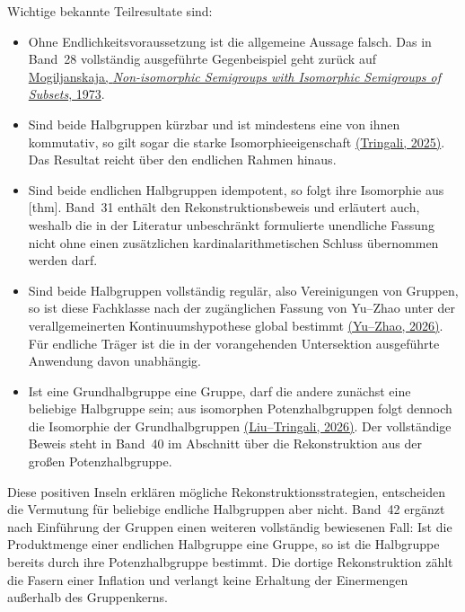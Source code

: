 \documentclass[main.tex]{subfiles}
\begin{document}
\begin{remark}
Wichtige bekannte Teilresultate sind:
\begin{itemize}
  \item Ohne Endlichkeitsvoraussetzung ist die allgemeine Aussage falsch.
    Das in Band~28 vollständig ausgeführte Gegenbeispiel geht zurück auf
    \href{https://doi.org/10.1007/BF02389140}%
      {Mogiljanskaja, \emph{Non-isomorphic Semigroups with Isomorphic
      Semigroups of Subsets}, 1973}.
  \item Sind beide Halbgruppen kürzbar und ist mindestens eine von ihnen
    kommutativ, so gilt sogar die starke Isomorphieeigenschaft
    \href{https://doi.org/10.1007/978-3-031-75326-8_20}%
      {(Tringali, 2025)}.  Das Resultat reicht über den endlichen Rahmen
      hinaus.
  \item Sind beide endlichen Halbgruppen idempotent, so folgt ihre
    Isomorphie aus
    [thm].
    Band~31 enthält den Rekonstruktionsbeweis und erläutert auch, weshalb
    die in der Literatur unbeschränkt formulierte unendliche Fassung nicht
    ohne einen zusätzlichen kardinalarithmetischen Schluss übernommen
    werden darf.
  \item Sind beide Halbgruppen vollständig regulär, also Vereinigungen von
    Gruppen, so ist diese Fachklasse nach der zugänglichen Fassung von
    Yu--Zhao unter der verallgemeinerten Kontinuumshypothese global bestimmt
    \href{https://doi.org/10.1080/00927872.2026.2659846}%
      {(Yu--Zhao, 2026)}.  Für endliche Träger ist die in der vorangehenden
      Untersektion ausgeführte Anwendung davon unabhängig.
  \item Ist eine Grundhalbgruppe eine Gruppe, darf die andere zunächst eine
    beliebige Halbgruppe sein; aus isomorphen Potenzhalbgruppen folgt
    dennoch die Isomorphie der Grundhalbgruppen
    \href{https://doi.org/10.48550/arXiv.2606.01917}%
      {(Liu--Tringali, 2026)}.  Der vollständige Beweis steht in Band~40 im
      Abschnitt über die Rekonstruktion aus der großen Potenzhalbgruppe.
\end{itemize}
Diese positiven Inseln erklären mögliche Rekonstruktionsstrategien, entscheiden
die Vermutung für beliebige endliche Halbgruppen aber nicht.
Band~42 ergänzt nach Einführung der Gruppen einen weiteren vollständig
bewiesenen Fall: Ist die Produktmenge einer endlichen Halbgruppe eine
Gruppe, so ist die Halbgruppe bereits durch ihre Potenzhalbgruppe bestimmt.
Die dortige Rekonstruktion zählt die Fasern einer Inflation und verlangt
keine Erhaltung der Einermengen außerhalb des Gruppenkerns.
\end{remark}
\end{document}
